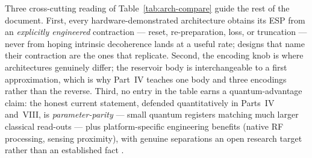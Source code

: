 Three cross-cutting reading of Table~\ref{tab:arch-compare} guide the rest of
the document. First, every hardware-demonstrated architecture obtains its ESP
from an \emph{explicitly engineered} contraction --- reset, re-preparation,
loss, or truncation --- never from hoping intrinsic decoherence lands at a
useful rate; designs that name their contraction are the ones that replicate.
Second, the encoding knob is where architectures genuinely differ; the
reservoir body is interchangeable to a first approximation, which is why
Part~IV teaches one body and three encodings rather than the reverse. Third,
no entry in the table earns a quantum-advantage claim: the honest current
statement, defended quantitatively in Parts~IV and~VIII, is
\emph{parameter-parity} --- small quantum registers matching much larger
classical read-outs --- plus platform-specific engineering benefits (native RF
processing, sensing proximity), with genuine separations an open research
target rather than an established fact
\citep{mujal2021opportunities,gotting2023exploring,palacios2024role}.
